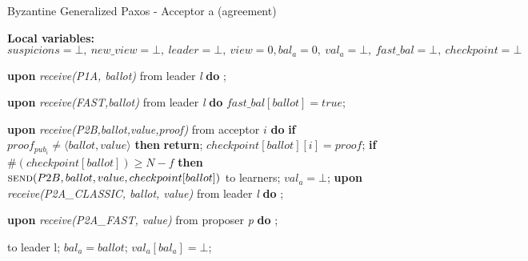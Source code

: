 \begin{algorithm} 
	\caption{Byzantine Generalized Paxos - Acceptor a (agreement)}
	\label{BFT-Acc}
	\textbf{Local variables:} $suspicions = \bot,\ new\_view = \bot,\ leader = \bot,\ view = 0, bal_a = 0,\ val_a = \bot,\ fast\_bal = \bot,\ checkpoint=\bot$
	\begin{algorithmic}[1]
		\State \textbf{upon} \textit{receive(P1A, ballot)} from leader \textit{l} \textbf{do}
		\State \hspace{\algorithmicindent} ;
		
		\State
		\State \textbf{upon} \textit{receive(FAST,ballot)} from leader \textit{l} \textbf{do}
		\State \hspace{\algorithmicindent} $fast\_bal[ballot] = true$;
		
		\State
		\State \textbf{upon} \textit{receive(P2B,ballot,value,proof)} from acceptor $i$ \textbf{do}
		\State \hspace{\algorithmicindent} \textbf{if} $proof_{pub_i} \neq \langle ballot, value \rangle$ \textbf{then}
		\State \hspace{\algorithmicindent}\hspace{\algorithmicindent} \textbf{return};
		\State \hspace{\algorithmicindent} $checkpoint[ballot][i] = proof$;
		\State \hspace{\algorithmicindent} \textbf{if} $\#(checkpoint[ballot]) \geq N-f$ \textbf{then}
		\State \hspace{\algorithmicindent}\hspace{\algorithmicindent} $\Call{send}{P2B, ballot, value, checkpoint[ballot]}$ to learners;
		\State \hspace{\algorithmicindent}\hspace{\algorithmicindent} $val_a = \bot$;
		\State
		\State \textbf{upon} \textit{receive(P2A\_CLASSIC, ballot, value)} from leader \textit{l} \textbf{do}
		\State \hspace{\algorithmicindent} ; 

		\State		
		\State \textbf{upon} \textit{receive(P2A\_FAST, value)} from proposer \textit{p} \textbf{do}
		\State \hspace{\algorithmicindent} ;
				
		\State
		\State {} to leader l;
		\State $bal_a = ballot$;	
		\State $val_a[bal_a] = \bot$;	
		\EndIf
		\EndFunction
	

\end{algorithmic}
\end{algorithm}
